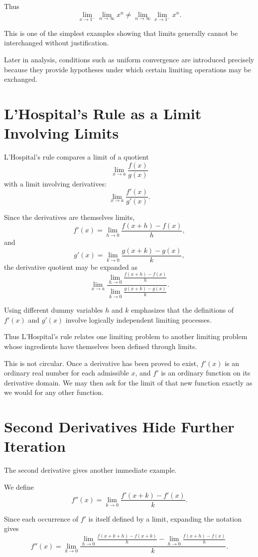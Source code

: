 \documentclass{essay}
\begin{document}
Thus
\[ \boxed{ \lim_{x\to1^-}\lim_{n\to\infty}x^{n} \neq \lim_{n\to\infty}\lim_{x\to1^-}x^{n}. } \]

This is one of the simplest examples showing that limits generally cannot be interchanged without justification.

Later in analysis, conditions such as uniform convergence are introduced precisely because they provide hypotheses under which certain limiting operations may be exchanged.

\section{L'Hospital's Rule as a Limit Involving Limits}

L'Hospital's rule compares a limit of a quotient
\[ \lim_{x\to a}\frac{f(x)}{g(x)} \]
with a limit involving derivatives:
\[ \lim_{x\to a}\frac{f'(x)}{g'(x)}. \]

Since the derivatives are themselves limits,
\[ f'(x) = \lim_{h\to0} \frac{f(x+h)-f(x)}{h}, \]
and
\[ g'(x) = \lim_{k\to0} \frac{g(x+k)-g(x)}{k}, \]
the derivative quotient may be expanded as
\[ \lim_{x\to a} \frac{ \displaystyle \lim_{h\to0} \frac{f(x+h)-f(x)}{h} }{ \displaystyle \lim_{k\to0} \frac{g(x+k)-g(x)}{k} }. \]

Using different dummy variables \(h\) and \(k\) emphasizes that the definitions of \(f'(x)\) and \(g'(x)\) involve logically independent limiting processes.

Thus L'Hospital's rule relates one limiting problem to another limiting problem whose ingredients have themselves been defined through limits.

This is not circular. Once a derivative has been proved to exist, \(f'(x)\) is an ordinary real number for each admissible \(x\), and \(f'\) is an ordinary function on its derivative domain. We may then ask for the limit of that new function exactly as we would for any other function.

\section{Second Derivatives Hide Further Iteration}

The second derivative gives another immediate example.

We define
\[ f''(x) = \lim_{k\to0} \frac{f'(x+k)-f'(x)}{k}. \]

Since each occurrence of \(f'\) is itself defined by a limit, expanding the notation gives
\[ f''(x) = \lim_{k\to0} \frac{ \displaystyle \lim_{h\to0} \frac{f(x+k+h)-f(x+k)}{h} - \displaystyle \lim_{h\to0} \frac{f(x+h)-f(x)}{h} }{k}. \]
\end{document}
